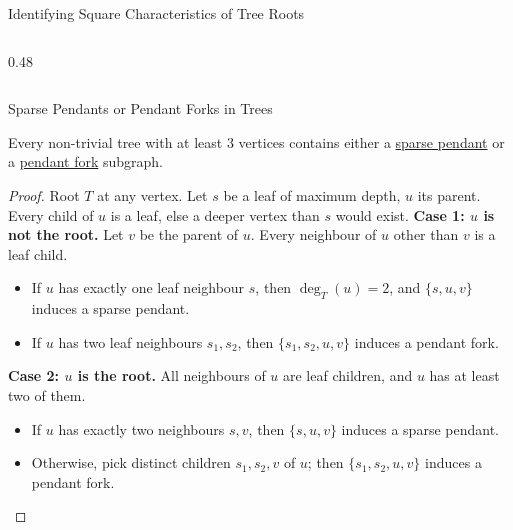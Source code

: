 \documentclass[10pt]{beamer}
\begin{document}
\begin{frame}{Identifying Square Characteristics of Tree Roots}
\begin{columns}[T]
\begin{column}{0.48\textwidth}
    \end{column}
  \end{columns}
\end{frame}

\begin{frame}{Sparse Pendants or Pendant Forks in Trees}
  \begin{lemma} \label{lemma::tree_pendant_pendant_fork}
    Every non-trivial tree with at least $3$ vertices contains either a \hyperref[def::sparse_pendant]{sparse pendant} or a \hyperref[def::pendant_fork]{pendant fork} subgraph.
  \end{lemma}

  \begin{proof}
    Root $T$ at any vertex. Let $s$ be a leaf of maximum depth, $u$ its parent. Every child of $u$ is a leaf, else a deeper vertex than $s$ would exist.
    \smallskip
    \textbf{Case 1: $u$ is not the root.} Let $v$ be the parent of $u$. Every neighbour of $u$ other than $v$ is a leaf child.
    \begin{itemize}
      \item If $u$ has exactly one leaf neighbour $s$, then $\deg_T(u)=2$, and $\{s,u,v\}$ induces a sparse pendant.
      \item If $u$ has two leaf neighbours $s_1,s_2$, then $\{s_1,s_2,u,v\}$ induces a pendant fork.
    \end{itemize}
    \smallskip
    \textbf{Case 2: $u$ is the root.} All neighbours of $u$ are leaf children, and $u$ has at least two of them.
    \begin{itemize}
      \item If $u$ has exactly two neighbours $s,v$, then $\{s,u,v\}$ induces a sparse pendant.
      \item Otherwise, pick distinct children $s_1,s_2,v$ of $u$; then $\{s_1,s_2,u,v\}$ induces a pendant fork. \qedhere
    \end{itemize}
  \end{proof}
\end{frame}
\end{document}
